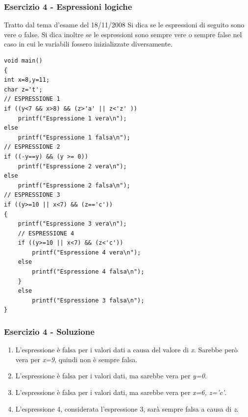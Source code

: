 \documentclass[format=169]{beamer}
\begin{document}
\begin{frame}[fragile]
\frametitle{Esercizio 4 - Espressioni logiche}
\tiny
\alert{Tratto dal tema d'esame del 18/11/2008}
Si dica se le espressioni di seguito sono vere o false. Si dica inoltre se le espressioni sono sempre vere o sempre false nel caso in cui le variabili fossero inizializzate diversamente.

\begin{lstlisting}[basicstyle=\tiny]
void main()
{
int x=8,y=11;
char z='t';
// ESPRESSIONE 1
if ((y<7 && x>8) && (z>'a' || z<'z' ))
	printf("Espressione 1 vera\n");
else
	printf("Espressione 1 falsa\n");
// ESPRESSIONE 2
if ((-y==y) && (y >= 0))
	printf("Espressione 2 vera\n");
else
	printf("Espressione 2 falsa\n");
// ESPRESSIONE 3
if ((y>=10 || x<7) && (z=='c'))
{
	printf("Espressione 3 vera\n");
	// ESPRESSIONE 4
	if ((y>=10 || x<7) && (z<'c'))
		printf("Espressione 4 vera\n");
	else
		printf("Espressione 4 falsa\n");
	}
	else
		printf("Espressione 3 falsa\n");
}
\end{lstlisting}
\end{frame}

\begin{frame}
\frametitle{Esercizio 4 - Soluzione}
\begin{enumerate}
\item L'espressione è falsa per i valori dati a causa del valore di \emph{x}. Sarebbe però vera per \emph{x=9}, quindi non è sempre falsa.

\item L'espressione è falsa per i valori dati, ma sarebbe vera per \emph{y=0}.

\item L'espressione è falsa per i valori dati, ma sarebbe vera per \emph{x=6, z='c'}.

\item L'espressione 4, considerata l'espressione 3, sarà sempre falsa a causa di \emph{z}.
\end{enumerate}
\end{frame}

\end{document}
